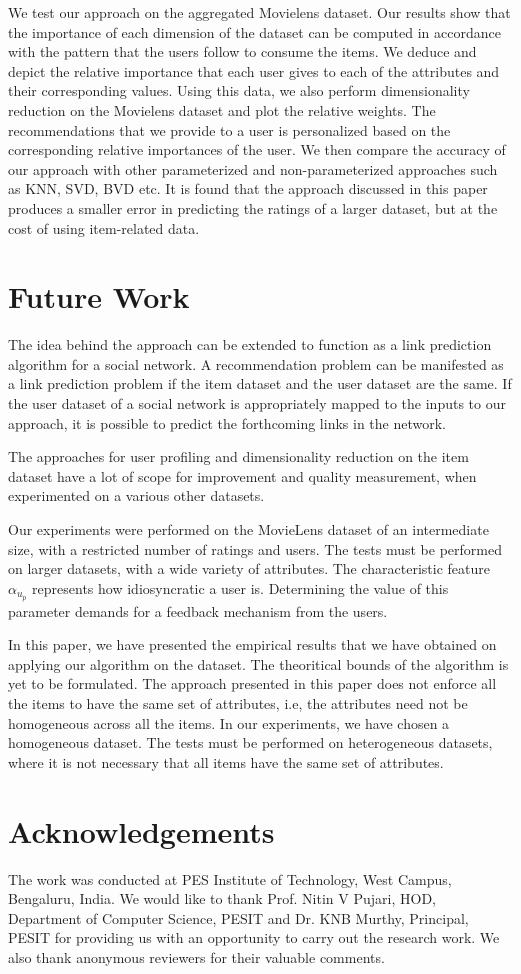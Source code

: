 \documentclass{acm_proc_article-sp}
\begin{document}
We test our approach on the aggregated Movielens dataset. Our results show that the importance of each dimension of the dataset can be computed in accordance with the pattern that the users follow to consume the items. We deduce and depict the relative importance that each user gives to each of the attributes and their corresponding values. Using this data, we also perform dimensionality reduction on the Movielens dataset and plot the relative weights. The recommendations that we provide to a user is personalized based on the corresponding relative importances of the user. We then compare the accuracy of our approach with other parameterized and non-parameterized approaches such as KNN, SVD, BVD etc. It is found that the approach discussed in this paper produces a smaller error in predicting the ratings of a larger dataset, but at the cost of using item-related data.

\section{Future Work}
The idea behind the approach can be extended to function as a link prediction algorithm for a social network. A recommendation problem can be manifested as a link prediction problem if the item dataset and the user dataset are the same. If the user dataset of a social network is appropriately mapped to the inputs to our approach, it is possible to predict the forthcoming links in the network.

The approaches for user profiling and dimensionality reduction on the item dataset have a lot of scope for improvement and quality measurement, when experimented on a various other datasets.

Our experiments were performed on the MovieLens dataset of an intermediate size, with a restricted number of ratings and users. The tests must be performed on larger datasets, with a wide variety of attributes. The characteristic feature $\alpha_{u_p}$ represents how idiosyncratic a user is. Determining the value of this parameter demands for a feedback mechanism from the users.

In this paper, we have presented the empirical results that we have obtained on applying our algorithm on the dataset. The theoritical bounds of the algorithm is yet to be formulated. The approach presented in this paper does not enforce all the items to have the same set of attributes, i.e, the attributes need not be homogeneous across all the items. In our experiments, we have chosen a homogeneous dataset. The tests must be performed on heterogeneous datasets, where it is not necessary that all items have the same set of attributes.

\section{Acknowledgements}
The work was conducted at PES Institute of Technology, West Campus, Bengaluru, India. We would like to thank Prof. Nitin V Pujari, HOD, Department of Computer Science, PESIT and Dr. KNB Murthy, Principal, PESIT for providing us with an opportunity to carry out the research work. We also thank anonymous reviewers for their valuable comments.
\newpage


\end{document}
